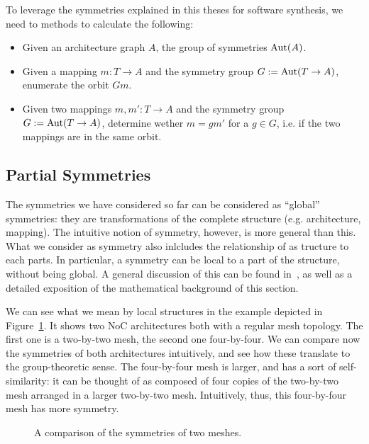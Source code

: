 To leverage the symmetries explained in this theses for software synthesis, we need to methods to calculate the following:
\begin{itemize}
\item Given an architecture graph $A$, the group of symmetries $\operatorname{Aut}(A)$.
\item Given a mapping $m : T \rightarrow A$ and the symmetry group $G := \operatorname{Aut}(T \rightarrow A)$, enumerate the orbit $Gm$.
\item Given two mappings $m,m' : T \rightarrow A$ and the symmetry group $G := \operatorname{Aut}(T \rightarrow A)$, determine wether $m = gm'$ for a $g \in G$, i.e. if the two mappings are in the same orbit.
\end{itemize}


\subsection{Partial Symmetries}

The symmetries we have considered so far can be considered as ``global'' symmetries: they are transformations of the complete structure (e.g. architecture, mapping).
The intuitive notion of symmetry, however, is more general than this. What we consider as symmetry also inlcludes the relationship of as tructure to each parts.
In particular, a symmetry can be local to a part of the structure, without being global. A general discussion of this can be found in~\cite{lawson_inverse_semigroups}, as well as a detailed exposition of the mathematical background of this section.

We can see what we mean by local structures in the example depicted in Figure~\ref{fig:motivation_partial_symmetries}.
It shows two \ac{NoC} architectures both with a regular mesh topology.
The first one is a two-by-two mesh, the second one four-by-four.
We can compare now the symmetries of both architectures intuitively, and see how these translate to the group-theoretic sense.
The four-by-four mesh is larger, and has a sort of self-similarity: it can be thought of as composed of four copies of the two-by-two mesh arranged in a larger two-by-two mesh.
Intuitively, thus, this four-by-four mesh has more symmetry.

\begin{figure}[h]
	\centering
   \resizebox{0.55\textwidth}{!}{}
	\caption{A comparison of the symmetries of two meshes.}
	\label{fig:motivation_partial_symmetries}
\end{figure}

